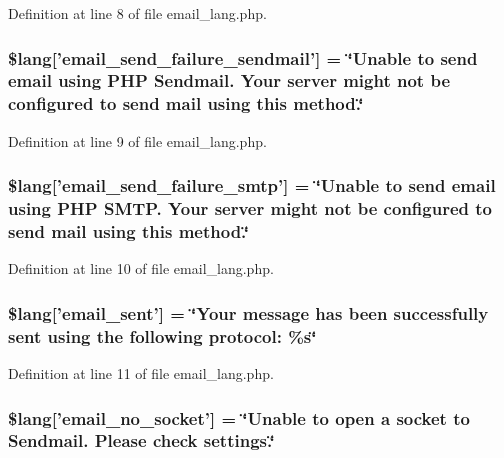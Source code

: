 Definition at line 8 of file email\-\_\-lang.\-php.

\subsubsection[{\$lang}]{\setlength{\rightskip}{0pt plus 5cm}\$lang['email\-\_\-send\-\_\-failure\-\_\-sendmail'] = \char`\"{}Unable {\bf to} send email using P\-H\-P Sendmail. Your server might {\bf not} be configured {\bf to} send mail using this method.\char`\"{}}\label{email__lang_8php_a0cfda188d86472ad2f3b96a67de75b4d}


Definition at line 9 of file email\-\_\-lang.\-php.

\subsubsection[{\$lang}]{\setlength{\rightskip}{0pt plus 5cm}\$lang['email\-\_\-send\-\_\-failure\-\_\-smtp'] = \char`\"{}Unable {\bf to} send email using P\-H\-P S\-M\-T\-P. Your server might {\bf not} be configured {\bf to} send mail using this method.\char`\"{}}\label{email__lang_8php_a37e19fc7057ba5d5300dd3e83cefc5a2}


Definition at line 10 of file email\-\_\-lang.\-php.

\subsubsection[{\$lang}]{\setlength{\rightskip}{0pt plus 5cm}\$lang['email\-\_\-sent'] = \char`\"{}Your message has been successfully sent using the following protocol\-: \%{\bf s}\char`\"{}}\label{email__lang_8php_a7e5c67019fdffb596af1af5a94247ba9}


Definition at line 11 of file email\-\_\-lang.\-php.

\subsubsection[{\$lang}]{\setlength{\rightskip}{0pt plus 5cm}\$lang['email\-\_\-no\-\_\-socket'] = \char`\"{}Unable {\bf to} open {\bf a} socket {\bf to} Sendmail. Please check settings.\char`\"{}}\label{email__lang_8php_a78f8be783ca93e91af775994ddc87cb7}


